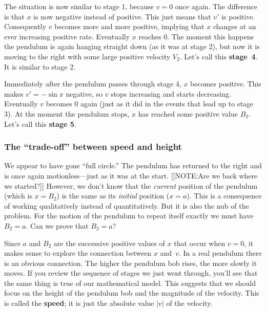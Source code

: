 
The situation is now similar to stage 1, because $v = 0$ once again.
The difference is that $x$ is now negative instead of positive.  This
just means that $v'$ is positive.  Consequently $v$ becomes more and
more positive, implying that $x$ changes at an ever increasing
positive rate.  Eventually $x$ reaches 0.  The moment this happens the
pendulum is again hanging straight down (as it was at stage 2), but
now it is moving to the right with some large positive velocity $V_2$.
Let's call this {\bf stage~4}.  It is similar to stage 2.

Immediately after the pendulum passes through stage 4, $x$ becomes
positive.  This makes $v' = -\sin{x}$ negative, so $v$ stops
increasing and starts decreasing.  Eventually $v$ becomes 0 again
(just as it did in the events that lead up to stage 3).  At the moment
the pendulum stops, $x$ has reached some positive value $B_2$.  Let's
call this {\bf stage 5}.

\subsubsection{The ``trade-off'' between speed and height}
\label{subsubsec:the-trade-off-between-speed-and-height}

We appear to have gone ``full circle.''  The pendulum has returned to
the right and is once again motionless---just as it was at the start.
[[NOTE:Are we back  where we started?]]	
However, we don't know that the {\em current\/} position of the
pendulum (which is $x = B_2$) is the same as its {\em initial\/}
position ($x = a$).  This is a consequence of working qualitatively
instead of quantitatively.  But it is also the nub of the problem.
For the motion of the pendulum to repeat itself exactly we must have
$B_2 = a$.  Can we prove that $B_2 = a$?

Since $a$ and $B_2$ are the successive positive values of $x$ that
occur when $v = 0$, it makes sense to explore the connection between
$x$ and~$v$.  In a real pendulum there is an obvious connection.  The
higher the pendulum bob rises, the more slowly it moves.  If you
review the sequence of stages we just went through, you'll see that
the same thing is true of our mathematical model.  This suggests that
we should focus on the height of the pendulum bob and the magnitude of
the velocity.  This is called the {\bf speed}; it is just
the absolute value $|v|$ of the velocity.


